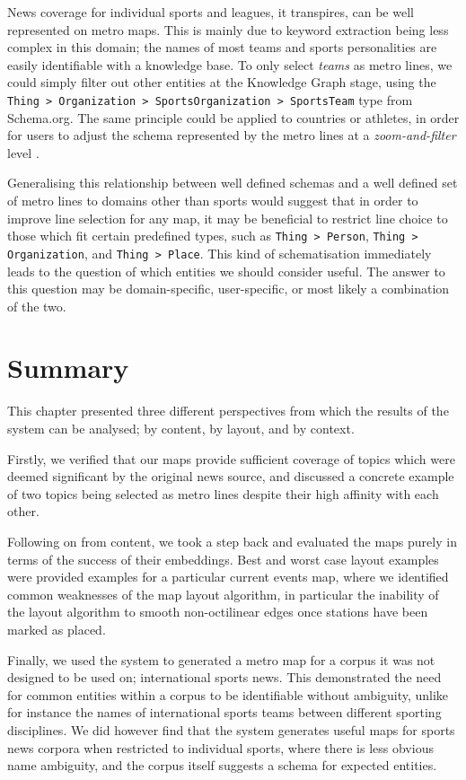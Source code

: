 News coverage for individual sports and leagues, it transpires, can be well represented on metro maps. This is mainly due to keyword extraction being less complex in this domain; the names of most teams and sports personalities are easily identifiable with a knowledge base. To only select \textit{teams} as metro lines, we could simply filter out other entities at the Knowledge Graph stage, using the \texttt{Thing > Organization > SportsOrganization > SportsTeam} type from Schema.org. The same principle could be applied to countries or athletes, in order for users to adjust the schema represented by the metro lines at a \textit{zoom-and-filter} level \citep{TheEyesHaveIt}.

Generalising this relationship between well defined schemas and a well defined set of metro lines to domains other than sports would suggest that in order to improve line selection for any map, it may be beneficial to restrict line choice to those which fit certain predefined types, such as \texttt{Thing > Person}, \texttt{Thing > Organization}, and \texttt{Thing > Place}. This kind of schematisation immediately leads to the question of which entities we should consider useful. The answer to this question may be domain-specific, user-specific, or most likely a combination of the two.

\section{Summary}

This chapter presented three different perspectives from which the results of the system can be analysed; by content, by layout, and by context. 

Firstly, we verified that our maps provide sufficient coverage of topics which were deemed significant by the original news source, and discussed a concrete example of two topics being selected as metro lines despite their high affinity with each other.

Following on from content, we took a step back and evaluated the maps purely in terms of the success of their embeddings. Best and worst case layout examples were provided examples for a particular current events map, where we identified common weaknesses of the map layout algorithm, in particular the inability of the layout algorithm to smooth non-octilinear edges once stations have been marked as placed.

Finally, we used the system to generated a metro map for a corpus it was not designed to be used on; international sports news. This demonstrated the need for common entities within a corpus to be identifiable without ambiguity, unlike for instance the names of international sports teams between different sporting disciplines. We did however find that the system generates useful maps for sports news corpora when restricted to individual sports, where there is less obvious name ambiguity, and the corpus itself suggests a schema for expected entities.

